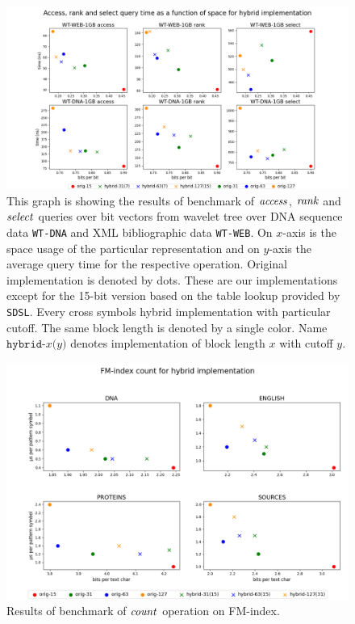 \begin{figure}
	\centerline{
		\includegraphics[width=\textwidth, height=0.35\textheight]{images/vysledky_sdsl_hybrid}
	}
	\caption[TODO]{This graph is showing the results of benchmark of $\mathit{access}$, $\mathit{rank}$ and $\mathit{select}$
	queries over bit vectors from wavelet tree over DNA sequence data \texttt{WT-DNA} and XML bibliographic
	data \texttt{WT-WEB}. On $x$-axis is the space usage of the particular representation and on $y$-axis
	the average query time for the respective operation. Original implementation is denoted by dots. These
	are our implementations except for the 15-bit version based on the table lookup provided by \texttt{SDSL}.
	Every cross symbols hybrid implementation with particular cutoff. The same block length is denoted by a
	single color. Name $\texttt{hybrid-}x\texttt{(}y\texttt{)}$ denotes implementation of block length $x$ with
	cutoff $y$.
	}
	\label{obr:vysledky_sdsl_hybrid}
\end{figure}

\begin{figure}
	\centerline{
		\includegraphics[width=\textwidth, height=0.5\textheight]{images/vysledky_sdsl_hybrid_count}
	}
	\caption[TODO]{Results of benchmark of $\mathit{count}$ operation on FM-index.
	}
	\label{obr:benchmark_sdsl_hybrid_count}
\end{figure}

